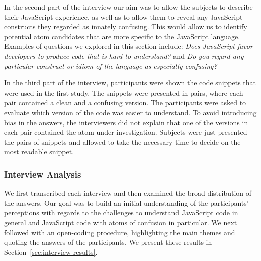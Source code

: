 In the second part of the interview our aim was to allow the subjects to describe their JavaScript experience, as well as to allow them to reveal any JavaScript constructs they regarded as innately confusing. This would allow us to identify potential atom candidates that are more specific to the JavaScript language. Examples of questions we explored in this section include: \emph{Does JavaScript favor developers to produce code that is hard to understand?} and \emph{Do you regard any particular construct or idiom of the language as especially confusing?}

In the third part of the interview, participants were shown the code snippets that were used in the first study. The snippets were presented in pairs, where each pair contained a clean and a confusing version. The participants 
were asked to evaluate which version of the code was easier to understand. To avoid introducing bias in the answers, the interviewers did not explain that one of the versions in each pair contained the atom under investigation. Subjects were just presented the pairs of snippets and allowed to take the necessary time to decide on the most readable snippet.

\subsubsection*{Interview Analysis}

We first transcribed each interview and then examined the broad distribution of the answers. Our goal was to build an initial understanding of the participants' perceptions with regards to the challenges to understand JavaScript code in general and JavaScript code with atoms of confusion in particular. We next followed with an open-coding procedure, highlighting the main themes and quoting the answers of the participants. We present these results in Section~\ref{sec:interview-results}. 




